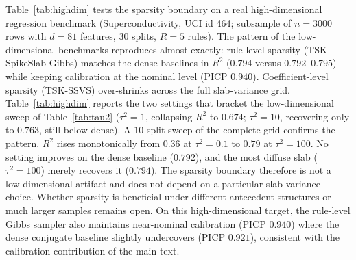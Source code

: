 \documentclass[review,1p,times]{elsarticle}
\begin{document}
Table~\ref{tab:highdim} tests the sparsity boundary on a real high-dimensional regression benchmark (Superconductivity, UCI id 464; subsample of $n=3000$ rows with $d=81$ features, $30$ splits, $R=5$ rules).
The pattern of the low-dimensional benchmarks reproduces almost exactly: rule-level sparsity (TSK-SpikeSlab-Gibbs) matches the dense baselines in $R^2$ ($0.794$ versus $0.792$--$0.795$) while keeping calibration at the nominal level (PICP $0.940$).
Coefficient-level sparsity (TSK-SSVS) over-shrinks across the full slab-variance grid.
Table~\ref{tab:highdim} reports the two settings that bracket the low-dimensional sweep of Table~\ref{tab:tau2} ($\tau^2=1$, collapsing $R^2$ to $0.674$; $\tau^2=10$, recovering only to $0.763$, still below dense).
A $10$-split sweep of the complete grid confirms the pattern.
$R^2$ rises monotonically from $0.36$ at $\tau^2=0.1$ to $0.79$ at $\tau^2=100$.
No setting improves on the dense baseline ($0.792$), and the most diffuse slab ($\tau^2=100$) merely recovers it ($0.794$).
The sparsity boundary therefore is not a low-dimensional artifact and does not depend on a particular slab-variance choice.
Whether sparsity is beneficial under different antecedent structures or much larger samples remains open. On this high-dimensional target, the rule-level Gibbs sampler also maintains near-nominal calibration (PICP $0.940$) where the dense conjugate baseline slightly undercovers (PICP $0.921$), consistent with the calibration contribution of the main text.
\end{document}
